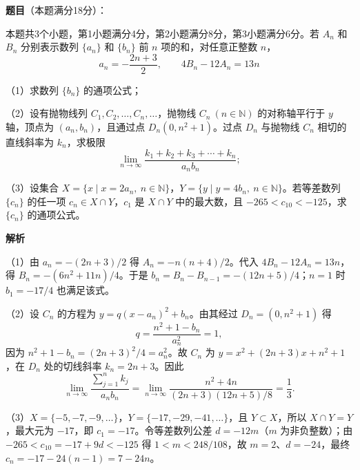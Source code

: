 \begin{answer}

\textbf{题目}（本题满分18分）：

本题共3个小题，第1小题满分4分，第2小题满分8分，第3小题满分6分。若 $A_n$ 和 $B_n$ 分别表示数列 $\{a_n\}$ 和 $\{b_n\}$ 前 $n$ 项的和，对任意正整数 $n$，
\nopagebreak[4]
\[
a_n=-\frac{2n+3}{2},\qquad 4B_n-12A_n=13n
\]

（1）求数列 $\{b_n\}$ 的通项公式；

（2）设有抛物线列 $C_1,C_2,\ldots,C_n,\ldots$，抛物线 $C_n\ (n\in\mathbb N)$ 的对称轴平行于 $y$ 轴，顶点为 $(a_n,b_n)$，且通过点 $D_n(0,n^2+1)$。过点 $D_n$ 与抛物线 $C_n$ 相切的直线斜率为 $k_n$，求极限
\nopagebreak[4]
\[
\lim_{n\to\infty}\frac{k_1+k_2+k_3+\cdots+k_n}{a_nb_n};
\]

（3）设集合 $X=\{x\mid x=2a_n,\ n\in\mathbb N\}$，$Y=\{y\mid y=4b_n,\ n\in\mathbb N\}$。若等差数列 $\{c_n\}$ 的任一项 $c_n\in X\cap Y$，$c_1$ 是 $X\cap Y$ 中的最大数，且 $-265<c_{10}<-125$，求 $\{c_n\}$ 的通项公式。

\textbf{解析}

（1）由 $a_n=-(2n+3)/2$ 得 $A_n=-n(n+4)/2$。代入 $4B_n-12A_n=13n$，得 $B_n=-(6n^2+11n)/4$。于是 $b_n=B_n-B_{n-1}=-(12n+5)/4$；$n=1$ 时 $b_1=-17/4$ 也满足该式。

（2）设 $C_n$ 的方程为 $y=q(x-a_n)^2+b_n$。由其经过 $D_n=(0,n^2+1)$ 得
\nopagebreak[4]
\[
q=\frac{n^2+1-b_n}{a_n^2}=1,
\]
因为 $n^2+1-b_n=(2n+3)^2/4=a_n^2$。故 $C_n$ 为 $y=x^2+(2n+3)x+n^2+1$，在 $D_n$ 处的切线斜率 $k_n=2n+3$。因此
\nopagebreak[4]
\[
\lim_{n\to\infty}\frac{\sum_{j=1}^n k_j}{a_nb_n}
=\lim_{n\to\infty}\frac{n^2+4n}{(2n+3)(12n+5)/8}=\frac13.
\]

（3）$X=\{-5,-7,-9,\ldots\}$，$Y=\{-17,-29,-41,\ldots\}$，且 $Y\subset X$，所以 $X\cap Y=Y$，最大元为 $-17$，即 $c_1=-17$。令等差数列公差 $d=-12m$（$m$ 为非负整数）；由 $-265<c_{10}=-17+9d<-125$ 得 $1<m<248/108$，故 $m=2$、$d=-24$，最终 $c_n=-17-24(n-1)=7-24n$。


\end{answer}